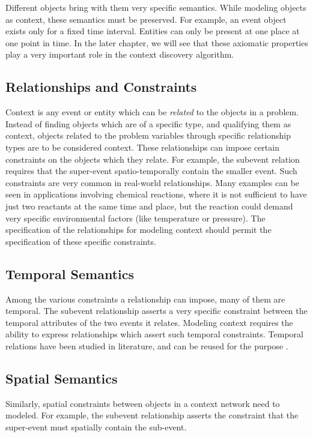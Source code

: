 Different objects bring with them very specific semantics. While modeling objects as context, these semantics must be preserved. For example, an event object exists only for a fixed time interval. Entities can only be present at one place at one point in time. In the later chapter, we will see that these axiomatic properties play a very important role in the context discovery algorithm.

\subsection{Relationships and Constraints}
Context is any event or entity which can be \textit{related} to the objects in a problem. Instead of finding objects which are of a specific type, and qualifying them as context, objects related to the problem variables through specific relationship types are to be considered context. These relationships can impose certain constraints on the objects which they relate. For example, the subevent relation requires that the super-event spatio-temporally contain the smaller event. Such constraints are very common in real-world relationships. Many examples can be seen in applications involving chemical reactions, where it is not sufficient to have just two reactants at the same time and place, but the reaction could demand very specific environmental factors (like temperature or pressure). The specification of the relationships for modeling context should permit the specification of these specific constraints.

\subsection{Temporal Semantics}
Among the various constraints a relationship can impose, many of them are temporal. The subevent relationship asserts a very specific constraint between the temporal attributes of the two events it relates. Modeling context requires the ability to express relationships which assert such temporal constraints. Temporal relations have been studied in literature, and can be reused for the purpose \cite{allen1983maintaining, wolter2000spatio}.

\subsection{Spatial Semantics}
Similarly, spatial constraints between objects in a context network need to modeled. For example, the subevent relationship asserts the constraint that the super-event must spatially contain the sub-event.

